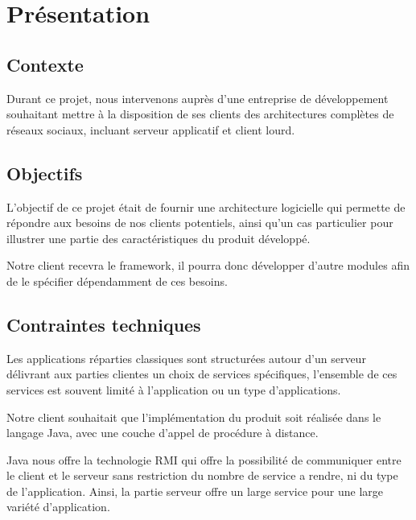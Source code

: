 
\section{Présentation}
\subsection{Contexte}
Durant ce projet, nous intervenons auprès d'une entreprise de développement souhaitant met\-tre à la disposition de ses clients des architectures complètes de réseaux sociaux, incluant serveur applicatif et client lourd.

\subsection{Objectifs}

L’objectif de ce projet était de fournir une architecture logicielle qui permette de répondre aux besoins de nos clients potentiels, ainsi qu’un cas particulier pour illustrer une partie des caractéristiques du produit développé.

Notre client recevra le framework, il pourra donc développer d’autre modules afin de le spécifier dépendamment de ces besoins.    

\subsection{Contraintes techniques}
Les applications réparties classiques sont structurées autour d'un serveur délivrant aux parties clientes un choix de services spécifiques, l'ensemble de ces services est souvent limité à l'application ou un type d'applications.

Notre client souhaitait que l'implémentation du produit soit réalisée dans le langage Java, avec une couche d'appel de procédure à distance.

Java nous offre la technologie RMI qui offre la possibilité de communiquer entre le client et le serveur sans restriction du nombre de service a rendre, ni du type de l’application. Ainsi, la partie serveur offre un large service pour une large variété d’application.